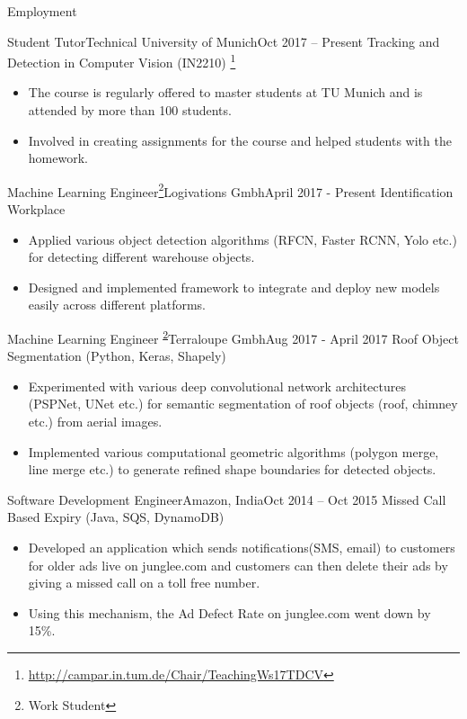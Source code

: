 \documentclass[]{mcdowellcv}
\begin{document}
	\begin{cvsection}{Employment}
	
			\begin{cvsubsection}{Student Tutor}{Technical University of Munich}{Oct 2017 -- Present}	
		Tracking and Detection in Computer Vision (IN2210) \footnote{\href{http://campar.in.tum.de/Chair/TeachingWs17TDCV}{http://campar.in.tum.de/Chair/TeachingWs17TDCV}}
			\begin{itemize}
				\item The course is regularly offered to master students at TU Munich and is attended by more than 100 students. 
				\item Involved in creating assignments for the course and helped students with the homework. 
			\end{itemize}
		\end{cvsubsection}
	
		\begin{cvsubsection}{Machine Learning Engineer\footnote{Work Student\label{ws}}}{Logivations Gmbh}{April 2017 - Present}
			Identification Workplace			
			\begin{itemize}
				\item Applied various object detection algorithms (RFCN, Faster RCNN, Yolo etc.) for detecting different warehouse objects.
				\item Designed and implemented framework to integrate and deploy new models easily across different platforms.
			\end{itemize}
		\end{cvsubsection}
		
		\begin{cvsubsection}{Machine Learning Engineer \textsuperscript{\ref{ws}}}{Terraloupe Gmbh}{Aug 2017 - April 2017}
			Roof Object Segmentation (Python, Keras, Shapely)
			\begin{itemize}
				\item Experimented with various deep convolutional network architectures (PSPNet, UNet etc.) for semantic segmentation of roof objects (roof, chimney etc.) from aerial images.
				\item Implemented various computational geometric algorithms (polygon merge, line merge etc.) to generate refined shape boundaries for detected objects.
			\end{itemize}
		\end{cvsubsection}
		
		\begin{cvsubsection}{Software Development Engineer}{Amazon, India}{Oct 2014 -- Oct 2015}		
		Missed Call Based Expiry (Java, SQS, DynamoDB)
			\begin{itemize}
				\item Developed an application which sends notifications(SMS, email) to customers for older ads live on junglee.com and customers can then delete their ads by giving a missed call on a toll free number. 
                \item Using this mechanism, the Ad Defect Rate on junglee.com went down by 15\%.
			\end{itemize}
		\end{cvsubsection}
		

\end{cvsection}
\end{document}
